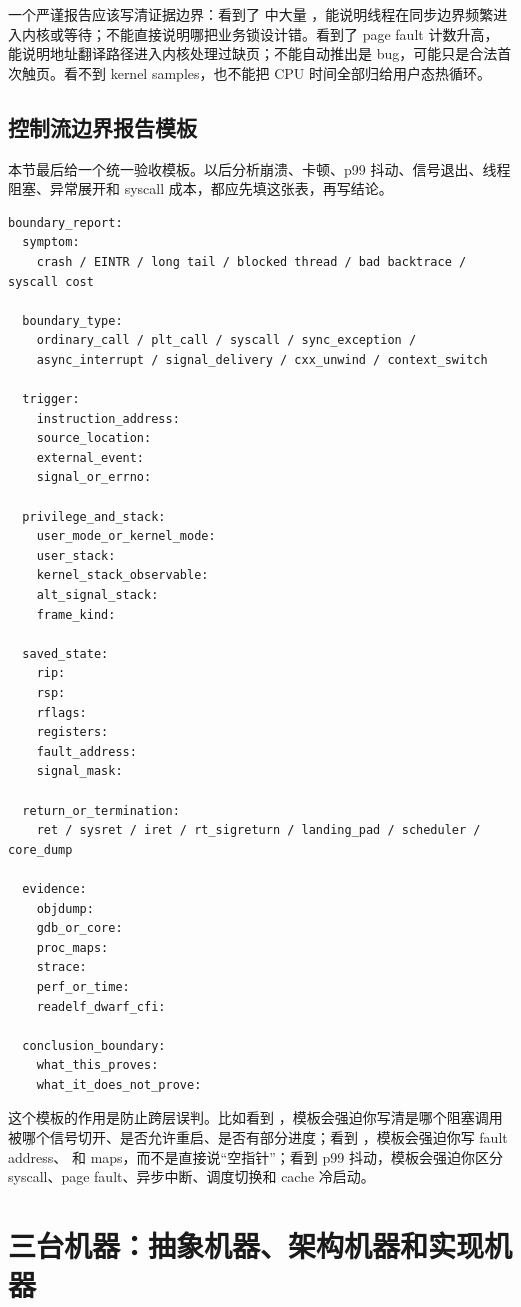 一个严谨报告应该写清证据边界：看到了  中大量 ，能说明线程在同步边界频繁进入内核或等待；不能直接说明哪把业务锁设计错。看到了 page fault 计数升高，能说明地址翻译路径进入内核处理过缺页；不能自动推出是 bug，可能只是合法首次触页。看不到 kernel samples，也不能把 CPU 时间全部归给用户态热循环。

\subsection{控制流边界报告模板}

本节最后给一个统一验收模板。以后分析崩溃、卡顿、p99 抖动、信号退出、线程阻塞、异常展开和 syscall 成本，都应先填这张表，再写结论。

\begin{lstlisting}[numbers=none,caption={控制流边界报告模板}]
boundary_report:
  symptom:
    crash / EINTR / long tail / blocked thread / bad backtrace / syscall cost

  boundary_type:
    ordinary_call / plt_call / syscall / sync_exception /
    async_interrupt / signal_delivery / cxx_unwind / context_switch

  trigger:
    instruction_address:
    source_location:
    external_event:
    signal_or_errno:

  privilege_and_stack:
    user_mode_or_kernel_mode:
    user_stack:
    kernel_stack_observable:
    alt_signal_stack:
    frame_kind:

  saved_state:
    rip:
    rsp:
    rflags:
    registers:
    fault_address:
    signal_mask:

  return_or_termination:
    ret / sysret / iret / rt_sigreturn / landing_pad / scheduler / core_dump

  evidence:
    objdump:
    gdb_or_core:
    proc_maps:
    strace:
    perf_or_time:
    readelf_dwarf_cfi:

  conclusion_boundary:
    what_this_proves:
    what_it_does_not_prove:
\end{lstlisting}

这个模板的作用是防止跨层误判。比如看到 ，模板会强迫你写清是哪个阻塞调用被哪个信号切开、是否允许重启、是否有部分进度；看到 ，模板会强迫你写 fault address、 和 maps，而不是直接说“空指针”；看到 p99 抖动，模板会强迫你区分 syscall、page fault、异步中断、调度切换和 cache 冷启动。

\section{三台机器：抽象机器、架构机器和实现机器}

